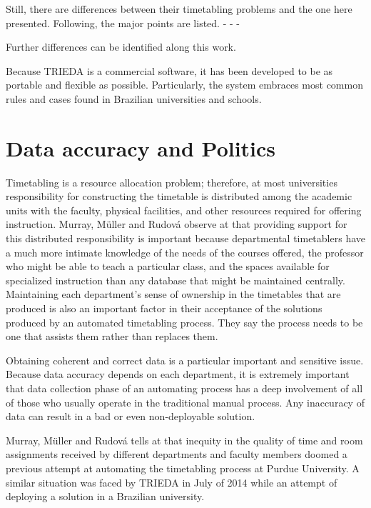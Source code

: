 Still, there are differences between their timetabling problems and the one here presented. Following, the major points are listed.
-
-
-

Further differences can be identified along this work.

Because TRIEDA is a commercial software, it has been developed to be as portable and flexible as possible. Particularly, the system embraces most common rules and cases found in Brazilian universities and schools.


\section{Data accuracy and Politics}

Timetabling is a resource allocation problem; therefore, at most universities responsibility for constructing the timetable is distributed among the academic units with the faculty, physical facilities, and other resources required for offering instruction. Murray, M\"{u}ller and Rudov\'{a} observe at \cite{Murray2007} that providing support for this distributed responsibility is important because departmental timetablers have a much more intimate knowledge of the needs of the courses offered, the professor who might be able to teach a particular class, and the spaces available for specialized instruction than any database that might be maintained centrally. Maintaining each department's sense of ownership in the timetables that are produced is also an important factor in their acceptance of the solutions produced by an automated timetabling process. They say the process needs to be one that assists them rather than replaces them.

Obtaining coherent and correct data is a particular important and sensitive issue. Because data accuracy depends on each department, it is extremely important that data collection phase of an automating process has a deep involvement of all of those who usually operate in the traditional manual process. Any inaccuracy of data can result in a bad or even non-deployable solution.


Murray, M\"{u}ller and Rudov\'{a} tells at \cite{Murray2007} that inequity in the quality of time and room assignments received by different departments and faculty members doomed a previous attempt at automating the timetabling process at Purdue University. A similar situation was faced by TRIEDA in July of 2014 while an attempt of deploying a solution in a Brazilian university.

